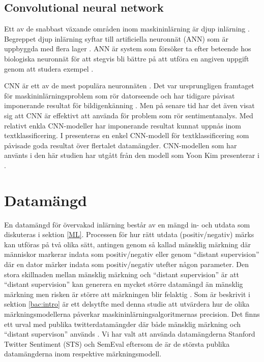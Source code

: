 \documentclass{kaumasters} %
\begin{document}
\subsection{Convolutional neural network}
Ett av de snabbast växande områden inom maskininlärning är djup inlärning \cite{TSAsurvey}. Begreppet djup inlärning syftar till artificiella neuronnät (ANN) som är uppbyggda med flera lager  \cite{cnn:001}. ANN är system som försöker ta efter beteende hos biologiska neuronnät för att stegvis bli bättre på att utföra en angiven uppgift genom att studera exempel \cite{wiki:015}. 

CNN är ett av de mest populära neuronnäten  \cite{cnn:001}. Det var ursprungligen framtaget för maskininlärningsproblem som rör datorseende och har tidigare påvisat imponerande resultat för bildigenkänning \cite{cnn:003, cnn:006}. Men på senare tid har det även visat sig att CNN är effektivt att använda för problem som rör sentimentanalys. Med relativt enkla CNN-modeller har imponerande resultat kunnat uppnås inom textklassificering.  I \cite{cnn:003} presenteras en enkel CNN-modell för textklassificering som påvisade goda resultat över flertalet datamängder. CNN-modellen som har använts i den här studien har utgått från den modell som Yoon Kim presenterar i \cite{cnn:003}.

\section{Datamängd} \label{DS}
En datamängd för övervakad inlärning består av en mängd in- och utdata som diskuteras i sektion \ref{ML}. Processen för hur rätt utdata (positiv/negativ) märks kan utföras på två olika sätt, antingen genom så kallad mänsklig märkning där människor markerar indata som positiv/negativ eller genom “distant supervision” där en dator märker indata som positiv/negativ utefter någon parameter. Den stora skillnaden mellan mänsklig märkning och “distant supervision” är att “distant supervision” kan generera en mycket större datamängd än mänsklig märkning men risken är större att märkningen blir felaktig \cite{TSAsurvey}. 
Som är beskrivit i sektion \ref{bac:intro} är ett delsytfte med denna studie att utvärdera hur de olika märkningsmodellerna påverkar maskininlärningsalgoritmernas precision. Det finns ett urval med publika twitterdatamängder där både mänsklig märkning och “distant supervison” används \cite{TSAsurvey}. Vi har valt att använda datamängderna Stanford Twitter Sentiment (STS) \cite{sts:001} och SemEval \cite{SemEval:001} eftersom de är de största publika datamängderna inom respektive märkningsmodell.
\end{document}
